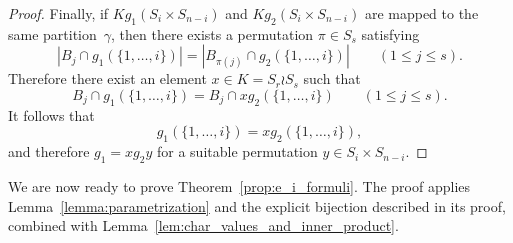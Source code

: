 \documentclass[10pt]{article}
\theoremstyle{definition}
\newcommand{\card}[1]{\ensuremath{\left|#1\right|}}
\begin{document}
\begin{proof}
    Finally, if $K g_1 (S_i \times S_{n-i})$ and $K g_2 (S_i \times S_{n-i})$ are mapped to the same partition~$\gamma$, then there exists a permutation $\pi \in S_s$ satisfying
    \[
        \card{B_j \cap g_1(\{1,\ldots,i\})}
        = \card{B_{\pi(j)} \cap g_2(\{1,\ldots,i\})}
        \qquad (1 \le j \le s).
    \]
    Therefore there exist an element $x \in K = S_r \wr S_s$ such that
    \[
        B_j \cap g_1(\{1,\ldots,i\})
        = B_j \cap xg_2(\{1,\ldots,i\})
        \qquad (1 \le j \le s).
    \]
    It follows that
    \[
        g_1(\{1,\ldots,i\}) = xg_2(\{1,\ldots,i\}),
    \]
    and therefore $g_1 = xg_2y$ for a suitable permutation $y \in S_i \times S_{n-i}$.
\end{proof}

We are now ready to prove Theorem~\ref{prop:e_i_formuli}. 
The proof applies Lemma~\ref{lemma:parametrization} and the explicit bijection described in its proof, combined with Lemma~\ref{lem:char_values_and_inner_product}. 
\end{document}
